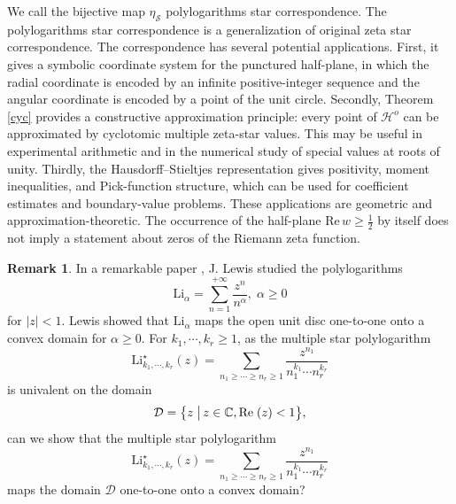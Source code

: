 \documentclass[12pt,a4paper]{amsart}
\numberwithin{equation}{section}
\theoremstyle{plain}
\theoremstyle{definition}
\newtheorem{rem}[Thm]{Remark}
\begin{document}
We call the bijective map $\eta_{\mathcal{S}}$ polylogarithms star correspondence. The polylogarithms star correspondence is a generalization of original zeta star correspondence.   The correspondence has several potential applications.  First, it gives a symbolic coordinate system for the punctured half-plane, in which the radial coordinate is encoded by an infinite positive-integer sequence and the angular coordinate is encoded by a point of the unit circle.  Secondly, Theorem \ref{cyc} provides a constructive approximation principle: every point of $\mathcal{H}^{o}$ can be approximated by cyclotomic multiple zeta-star values.  This may be useful in experimental arithmetic and in the numerical study of special values at roots of unity.  Thirdly, the Hausdorff--Stieltjes representation gives positivity, moment inequalities, and Pick-function structure, which can be used for coefficient estimates and boundary-value problems.  These applications are geometric and approximation-theoretic. The occurrence of the half-plane $\mathrm{Re}\,w\geq\frac12$ by itself does not imply a statement about zeros of the Riemann zeta function.

 \begin{rem}
  In a remarkable paper \cite{lew}, J. Lewis studied the polylogarithms 
  \[
  \mathrm{Li}_{\alpha}=\sum_{n=1}^{+\infty} \frac{z^n}{n^{\alpha}},\; \alpha \geq 0
  \]
  for $|z|<1$. Lewis showed that $ \mathrm{Li}_{\alpha}$ maps the open unit disc one-to-one onto a convex domain for $\alpha\geq 0$.  For $k_1,\cdots, k_r\geq 1$, as the multiple star polylogarithm 
      \[
{ \mathrm{Li}^\star_{k_1,\cdots,k_r}(z)}=\sum_{n_1\geq  \cdots\geq  n_r\geq 1}\frac{z^{n_1}}{n_1^{k_1}\cdots n_r^{k_r}}
              \] 
               is univalent on the domain  \[\mathcal{D}=\big{\{}z\;\big{|}\, z\in \mathbb{C}, \mathrm{Re}\; (z)<1\big{\}} ,\] 
               can we show that  the multiple star polylogarithm 
               \[
 \mathrm{Li}^\star_{k_1,\cdots,k_r}(z)=\sum_{n_1\geq  \cdots\geq  n_r\geq 1}\frac{z^{n_1}}{n_1^{k_1}\cdots n_r^{k_r}}\] maps the domain $\mathcal{D}$ one-to-one onto a convex domain?
                 \end{rem}
                 
\end{document}
